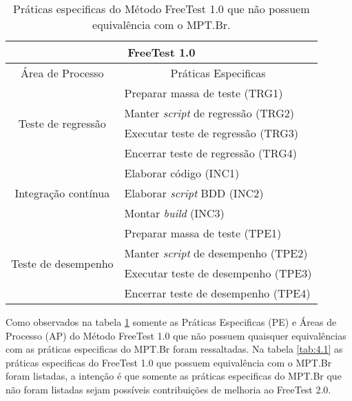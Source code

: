 \begin{table}[H]
\centering
\caption{Práticas especificas do Método FreeTest 1.0 que não possuem equivalência com o MPT.Br.}
\label{tab:4.2}
\begin{tabular}{|c|l|}
\hline
\multicolumn{2}{|c|}{\textbf{FreeTest 1.0}}                                     \\ \hline
Área de Processo                     & \multicolumn{1}{c|}{Práticas Especificas} \\ \hline
\multirow{4}{*}{Teste de regressão}  & Preparar massa de teste (TRG1)            \\ \cline{2-2} 
                                     & Manter \textit{script} de regressão (TRG2)         \\ \cline{2-2} 
                                     & Executar teste de regressão (TRG3)        \\ \cline{2-2} 
                                     & Encerrar teste de regressão (TRG4)        \\ \hline
\multirow{3}{*}{Integração contínua} & Elaborar código (INC1)                    \\ \cline{2-2} 
                                     & Elaborar \textit{script} BDD (INC2)                \\ \cline{2-2} 
                                     & Montar \textit{build} (INC3)                       \\ \hline
\multirow{4}{*}{Teste de desempenho} & Preparar massa de teste (TPE1)            \\ \cline{2-2} 
                                     & Manter \textit{script} de desempenho (TPE2)        \\ \cline{2-2} 
                                     & Executar teste de desempenho (TPE3)       \\ \cline{2-2} 
                                     & Encerrar teste de desempenho (TPE4)       \\ \hline
\end{tabular}
\end{table}

Como observados na tabela \ref{tab:4.2} somente as Práticas Especificas (PE) e Áreas de Processo (AP) do Método FreeTest 1.0 que não possuem quaisquer equivalências com as práticas especificas do MPT.Br foram ressaltadas. Na tabela \ref{tab:4.1} as práticas especificas do FreeTest 1.0 que possuem equivalência com o MPT.Br foram listadas, a intenção é que somente as práticas especificas do MPT.Br que não foram listadas sejam possíveis contribuições de melhoria ao FreeTest 2.0.

